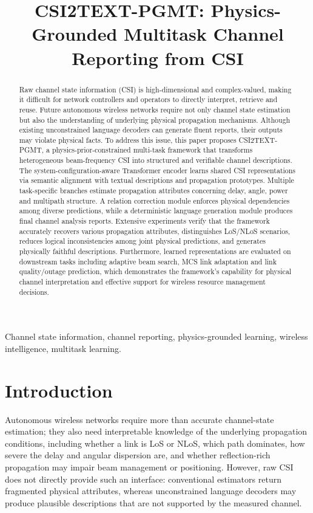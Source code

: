 \documentclass[conference]{IEEEtran}
\title{CSI2TEXT-PGMT: Physics-Grounded Multitask Channel Reporting from CSI}
\author{}
\begin{document}
\maketitle

\begin{abstract}
Raw channel state information (CSI) is high-dimensional and complex-valued, making it difficult for
network controllers and operators to directly interpret, retrieve and reuse. Future autonomous
wireless networks require not only channel state estimation but also the understanding of underlying
physical propagation mechanisms. Although existing unconstrained language decoders can generate
fluent reports, their outputs may violate physical facts. To address this issue, this paper proposes
CSI2TEXT-PGMT, a physics-prior-constrained multi-task framework that transforms heterogeneous
beam-frequency CSI into structured and verifiable channel descriptions. The
system-configuration-aware Transformer encoder learns shared CSI representations via semantic
alignment with textual descriptions and propagation prototypes. Multiple task-specific branches
estimate propagation attributes concerning delay, angle, power and multipath structure. A relation
correction module enforces physical dependencies among diverse predictions, while a deterministic
language generation module produces final channel analysis reports. Extensive experiments verify
that the framework accurately recovers various propagation attributes, distinguishes LoS/NLoS
scenarios, reduces logical inconsistencies among joint physical predictions, and generates physically
faithful descriptions. Furthermore, learned representations are evaluated on downstream tasks
including adaptive beam search, MCS link adaptation and link quality/outage prediction, which
demonstrates the framework's capability for physical channel interpretation and effective support for
wireless resource management decisions.
\end{abstract}

\begin{IEEEkeywords}
Channel state information, channel reporting, physics-grounded learning, wireless intelligence,
multitask learning.
\end{IEEEkeywords}

\section{Introduction}

Autonomous wireless networks require more than accurate channel-state estimation; they also need
interpretable knowledge of the underlying propagation conditions, including whether a link is LoS
or NLoS, which path dominates, how severe the delay and angular dispersion are, and whether
reflection-rich propagation may impair beam management or positioning. However, raw CSI does not
directly provide such an interface: conventional estimators return fragmented physical attributes,
whereas unconstrained language decoders may produce plausible descriptions that are not supported
by the measured channel.
\end{document}
